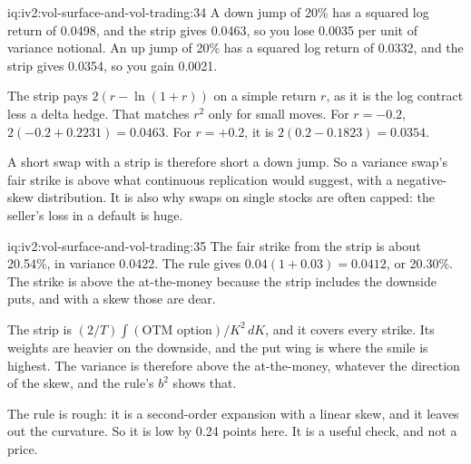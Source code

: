 \begin{solution}{iq:iv2:vol-surface-and-vol-trading:34}
A down jump of 20\% has a squared log return of 0.0498, and the strip gives 0.0463, so you lose 0.0035 per unit of variance notional. An up jump of 20\% has a squared log return of 0.0332, and the strip gives 0.0354, so you gain 0.0021.

The strip pays $2(r - \ln(1 + r))$ on a simple return $r$, as it is the log contract less a delta hedge. That matches $r^2$ only for small moves. For $r = -0.2$, $2(-0.2 + 0.2231) = 0.0463$. For $r = +0.2$, it is $2(0.2 - 0.1823) = 0.0354$.

A short swap with a strip is therefore short a down jump. So a variance swap's fair strike is above what continuous replication would suggest, with a negative-skew distribution. It is also why swaps on single stocks are often capped: the seller's loss in a default is huge.

\end{solution}

\begin{solution}{iq:iv2:vol-surface-and-vol-trading:35}
The fair strike from the strip is about 20.54\%, in variance 0.0422. The rule gives $0.04(1 + 0.03) = 0.0412$, or 20.30\%. The strike is above the at-the-money because the strip includes the downside puts, and with a skew those are dear.

The strip is $(2/T)\int(\text{OTM option})/K^2\,dK$, and it covers every strike. Its weights are heavier on the downside, and the put wing is where the smile is highest. The variance is therefore above the at-the-money, whatever the direction of the skew, and the rule's $b^2$ shows that.

The rule is rough: it is a second-order expansion with a linear skew, and it leaves out the curvature. So it is low by 0.24 points here. It is a useful check, and not a price.

\end{solution}

